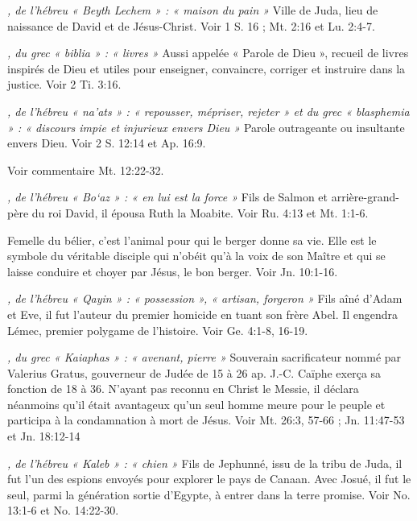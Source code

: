\begin{multicols}{2}
{\textit{, de l'hébreu « Beyth Lechem » : « maison du pain »}\newline
Ville de Juda, lieu de naissance de David et de Jésus-Christ. Voir 1 S. 16 ; Mt. 2:16 et Lu. 2:4-7.

\textit{, du grec « biblia » : « livres »}\newline
Aussi appelée « Parole de Dieu », recueil de livres inspirés de Dieu et utiles pour enseigner, convaincre, corriger et instruire dans la justice. Voir 2 Ti. 3:16.

\textit{, de l'hébreu « na'ats » : « repousser, mépriser, rejeter » et du grec « blasphemia » : « discours impie et injurieux envers Dieu »}\newline
Parole outrageante ou insultante envers Dieu. Voir 2 S. 12:14 et Ap. 16:9.

\textit{}\newline
Voir commentaire Mt. 12:22-32.

\textit{, de l'hébreu « Bo`az » : « en lui est la force »}\newline
Fils de Salmon et arrière-grand-père du roi David, il épousa Ruth la Moabite. Voir Ru. 4:13 et Mt. 1:1-6.

\textit{}\newline
Femelle du bélier, c'est l'animal pour qui le berger donne sa vie. Elle est le symbole du véritable disciple qui n'obéit qu'à la voix de son Maître et qui se laisse conduire et choyer par Jésus, le bon berger. Voir Jn. 10:1-16.

\textit{, de l'hébreu « Qayin » : « possession », « artisan, forgeron »}\newline
Fils aîné d'Adam et Eve, il fut l'auteur du premier homicide en tuant son frère Abel. Il engendra Lémec, premier polygame de l'histoire. Voir Ge. 4:1-8, 16-19.

\textit{, du grec « Kaiaphas » : « avenant, pierre »}\newline
Souverain sacrificateur nommé par Valerius Gratus, gouverneur de Judée de 15 à 26 ap. J.-C. Caïphe exerça sa fonction de 18 à 36. N'ayant pas reconnu en Christ le Messie, il déclara néanmoins qu'il était avantageux qu'un seul homme meure pour le peuple et participa à la condamnation à mort de Jésus. Voir Mt. 26:3, 57-66 ; Jn. 11:47-53 et Jn. 18:12-14

\textit{, de l'hébreu « Kaleb » : « chien »}\newline
Fils de Jephunné, issu de la tribu de Juda, il fut l'un des espions envoyés pour explorer le pays de Canaan. Avec Josué, il fut le seul, parmi la génération sortie d'Egypte, à entrer dans la terre promise. Voir No. 13:1-6 et No. 14:22-30.

}
\end{multicols}
